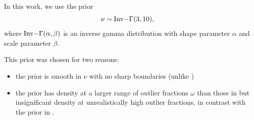 \documentclass[fleqn,usenatbib]{mnras}
\begin{document}
In this work, we use the prior
\begin{equation}
    \nu \sim {\rm Inv-}\Gamma(3, 10),
\end{equation}
where ${\rm Inv-}\Gamma(\alpha, \beta)$ is an inverse gamma distribution with
{\color{red} shape parameter $\alpha$ and scale parameter $\beta$}.

This prior was chosen for two reasons:
\begin{itemize}
    \item the prior is smooth in $\nu$ with no sharp boundaries (unlike
          \citet{Gelman:2013})
    \item the prior has density at a larger range of outlier fractions $\omega$
          than those in \citet{Juarez:2010, Ding:2014} but insignificant density
          at unrealistically high outlier fractions, in contrast with the prior
          in \citet{Feeney:2018}.
\end{itemize}



\bsp	%
\label{lastpage}
\end{document}
